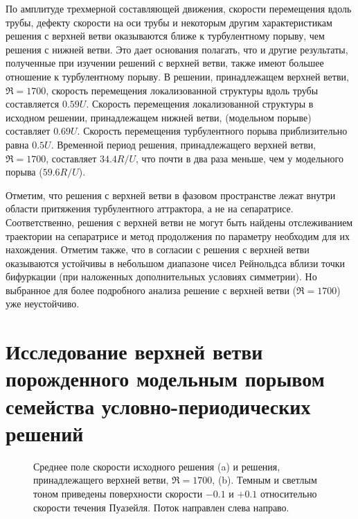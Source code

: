По амплитуде трехмерной составляющей движения, скорости перемещения вдоль трубы, дефекту скорости на оси трубы и некоторым другим характеристикам решения с верхней ветви оказываются ближе к турбулентному порыву, чем решения с нижней ветви. Это дает основания полагать, что и другие результаты, полученные при изучении решений с верхней ветви, также имеют большее отношение к турбулентному порыву. В решении, принадлежащем верхней ветви, $\Re = 1700$, скорость перемещения локализованной структуры вдоль трубы составляется $0.59U$. Скорость перемещения локализованной структуры в исходном решении, принадлежащем нижней ветви, (модельном порыве) составляет $0.69U$. Скорость перемещения турбулентного порыва приблизительно равна $0.5U$. Временной период решения, принадлежащего верхней ветви, $\Re = 1700$, составляет $34.4 R/U$, что почти в два раза меньше, чем у модельного порыва ($59.6R/U$). 

Отметим, что решения с верхней ветви в фазовом пространстве лежат внутри области притяжения турбулентного аттрактора, а не на сепаратрисе. Соответственно, решения с верхней ветви не могут быть найдены отслеживанием траектории на сепаратрисе и метод продолжения по параметру необходим для их нахождения. Отметим также, что в согласии с \cite{Avila2013} решения с верхней ветви оказываются устойчивы в небольшом диапазоне чисел Рейнольдса вблизи точки бифуркации (при наложенных дополнительных условиях симметрии). Но выбранное для более подробного анализа решение с верхней ветви ($\Re = 1700$) уже неустойчиво. 


\section{Исследование верхней ветви порожденного модельным порывом семейства условно-периодических решений}

\begin{figure}
\caption{Среднее поле скорости исходного решения (a) и решения, принадлежащего верхней ветви, $\Re=1700$, (b). Темным и светлым тоном приведены поверхности скорости $-0.1$ и $+0.1$ относительно скорости течения Пуазейля. Поток направлен слева направо.}
\label{3D_contin_cmp_pic}
\end{figure}

